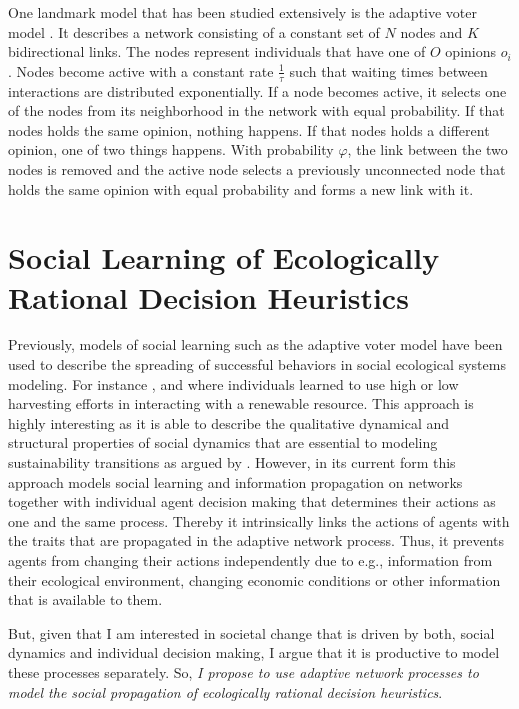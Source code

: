 One landmark model that has been studied extensively is the adaptive voter model \citep{Holme2006a, Bohme2011, Rogers2013, Klamser2016, Min2017}. It describes a network consisting of a constant set of $N$ nodes and $K$ bidirectional links. The nodes represent individuals that have one of $O$ opinions $o_i$. Nodes become active with a constant rate $\frac{1}{\tau}$ such that waiting times between interactions are distributed exponentially. If a node becomes active, it selects one of the nodes from its neighborhood in the network with equal probability. If that nodes holds the same opinion, nothing happens. If that nodes holds a different opinion, one of two things happens. With probability $\varphi$, the link between the two nodes is removed and the active node selects a previously unconnected node that holds the same opinion with equal probability and forms a new link with it.

\section{Social Learning of Ecologically Rational Decision Heuristics}

Previously, models of social learning such as the adaptive voter model have been used to describe the spreading of successful behaviors in social ecological systems modeling. For instance \cite{Wiedermann2015}, \cite{Barfuss2017} and \cite{Geier2019} where individuals learned to use high or low harvesting efforts in interacting with a renewable resource. This approach is highly interesting as it is able to describe the qualitative dynamical and structural properties of social dynamics that are essential to modeling sustainability transitions as argued by \cite{Lade2017}.
However, in its current form this approach models social learning and information propagation on networks together with individual agent decision making that determines their actions as one and the same process. Thereby it intrinsically links the actions of agents with the traits that are propagated in the adaptive network process. Thus, it prevents agents from changing their actions independently due to e.g., information from their ecological environment, changing economic conditions or other information that is available to them. 

But, given that I am interested in societal change that is driven by both, social dynamics and individual decision making, I argue that it is productive to model these processes separately. So, \emph{I propose to use adaptive network processes to model the social propagation of ecologically rational decision heuristics}.

